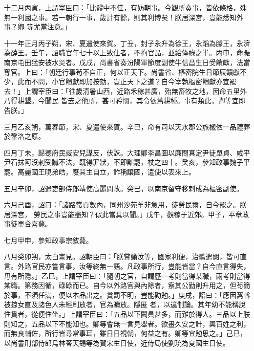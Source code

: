 \begin{pinyinscope}
 十二月丙寅，上謂宰臣曰：「比體中不佳，有妨朝事。今觀所奏事，皆依條格，殊無一利國之事。若一朝行一事，歲計有餘，則其利博矣！朕居深宮，豈能悉知外事？卿
 等尤當注意。」



 十一年正月丙子朔，宋、夏遣使來賀。丁丑，封子永升為徐王，永蹈為滕王，永濟為薛王。壬午，詔職官年七十以上致仕者，不拘官品，並給俸祿之半。丙申，命賑南京屯田猛安被水災者。戊戌，尚書省奏汾陽軍節度副使牛信昌生日受饋獻，法當奪官。上曰：「朝廷行事茍不自正，何以正天下。尚書省、樞密院生日節辰饋獻不少，此而不問，小官饋獻即加按劾，豈正天下之道？自今宰執樞密饋獻亦宜罷去！」上謂宰臣曰：「往歲清暑山西，近路禾稼甚廣，殆無畜牧之地，因命五里外乃得耕墾。今聞民
 皆去之他所，甚可矜憫，其令依舊耕種。事有類此，卿等宜即告朕。」



 三月乙亥朔，萬春節，宋、夏遣使來賀。辛巳，命有司以天水郡公旅櫬依一品禮葬於鞏洛之原。



 四月丁未，歸德府民臧安兒謀反，伏誅。大理卿李昌圖以廉問真定尹徒單貞、咸平尹石抹阿沒剌受贓不法，既得罪狀，不即黜罷，杖之四十。癸亥，參知政事魏子平罷。高麗國王晛弟皓，廢其主自立，詐稱讓國，遣使以表來上。



 五月辛卯，詔遣吏部侍郎靖使高麗問故。癸巳，以南京留守移剌成為樞密副使。



 六月己酉，詔曰：「諸路常貢數內，同州沙苑羊非急用，徒勞民爾，自今罷之。朕居深宮，
 勞民之事豈能盡知？似此當具以聞。」戊午，觀稼于近郊。甲子，平章政事徒單合喜薨。



 七月甲申，參知政事宗敘薨。



 八月癸卯朔，太白晝見。詔朝臣曰：「朕嘗諭汝等，國家利便，治體遣闕，皆可直言。外路官民亦嘗言事，汝等終無一語。凡政事所行，豈能皆當？自今直言得失，毋有所隱。」乙巳，上謂宰臣曰：「隨朝之官，自謂歷一考則當得某職，兩考則當得某職。第務因循，碌碌而已。自今以外路官與內除者，察其公勤則升用之，但茍簡於事，不須任滿，便以本品出之。賞罰不明，豈能勸勉。」庚戌，詔曰：「應因窩斡被掠女直及諸色人未經刷放者，官為贖放。隱匿
 者，以違制論。其年幼不能稱說住貫者，從便住坐。」上謂宰臣曰：「五品以下闕員甚多，而難於得人。三品以上朕則知之，五品以下不能知也。卿等會無一言見舉者。欲畫久安之計，興百姓之利，而無良輔佐，所行皆尋常事耳，雖日日視朝，何益之有。卿等宜勉思之。」己巳，以尚書刑部侍郎烏林答天錫等為賀宋生日使，近侍局使劉珫為夏國生日使。




\end{pinyinscope}
